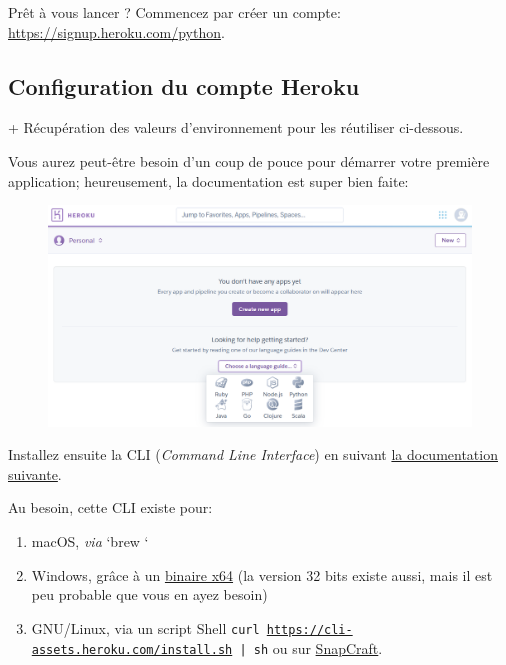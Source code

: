 \documentclass[11pt]{amsbook}
\begin{document}
Prêt à vous lancer ? Commencez par créer un compte: \href{https://signup.heroku.com/python}{https://signup.heroku.com/python}.


\hypertarget{x-configuration-du-compte-heroku}{\subsection{Configuration du compte Heroku}}
+ Récupération des valeurs d’environnement pour les réutiliser ci-dessous.


Vous aurez peut-être besoin d’un coup de pouce pour démarrer votre première application; heureusement, la documentation est super bien faite:


\begin{figure}[h]{}
\centering\includegraphics[width=2.5truein]{images/deployment/heroku-new-app.png}
\caption{}

\end{figure}

Installez ensuite la CLI (\emph{Command Line Interface}) en suivant \href{https://devcenter.heroku.com/articles/heroku-cli}{la documentation suivante}.


Au besoin, cette CLI existe pour:


\begin{enumerate}

\item{macOS, \emph{via} `brew `}

\item{Windows, grâce à un \href{https://cli-assets.heroku.com/heroku-x64.exe}{binaire x64} (la version 32 bits existe aussi, mais il est peu probable que vous en ayez besoin)}

\item{GNU/Linux, via un script Shell \texttt{curl \href{https://cli-assets.heroku.com/install.sh}{https://cli-assets.heroku.com/install.sh} | sh} ou sur \href{https://snapcraft.io/heroku}{SnapCraft}.}

\end{enumerate}
\end{document}
